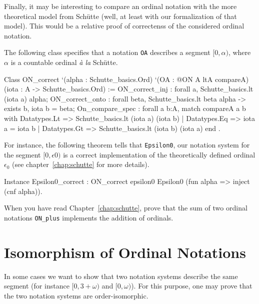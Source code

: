 Finally, it may be interesting to compare an ordinal notation with the more theoretical model from Schütte (well, at least with our formalization of that model). This would be a relative proof of correctenss of the considered  ordinal  notation.

The following class specifies that a notation \texttt{OA} describes a segment $[0,\alpha)$,
where $\alpha$ is a countable ordinal \emph{à la}  Schütte.


\label{types:ON-for}

\begin{Coqsrc}
Class ON_correct `(alpha : Schutte_basics.Ord)
     `(OA : @ON A ltA  compareA)
      (iota : A -> Schutte_basics.Ord) :=
  { ON_correct_inj : forall a, Schutte_basics.lt (iota a) alpha;
    ON_correct_onto : forall beta, Schutte_basics.lt beta alpha ->
                                exists b, iota b = beta;
    On_compare_spec : forall a b:A,
        match compareA a b with
          Datatypes.Lt => Schutte_basics.lt (iota a) (iota b)
        | Datatypes.Eq => iota a = iota b
        | Datatypes.Gt => Schutte_basics.lt (iota b) (iota a)
        end
}.
\end{Coqsrc}



For instance, the following theorem tells that \texttt{Epsilon0}, our notation system for the segment $[0,\epsilon0)$ is a correct implementation of the theoretically defined  ordinal $\epsilon_0$
(see chapter~\ref{chap:schutte} for more details).


\begin{Coqsrc}
Instance Epsilon0_correct :
  ON_correct epsilon0 Epsilon0  (fun alpha => inject (cnf alpha)).
\end{Coqsrc}


\begin{project}
  When you have read Chapter~\ref{chap:schutte}, prove that the sum of two ordinal notations \texttt{ON\_plus} implements the addition of ordinals.
\end{project}





\section{Isomorphism of Ordinal Notations}


In some cases we want to show that two notation systems describe the same segment (for instance $[0,3+\omega)$ and $[0,\omega)$\;). For this purpose, one may prove that the two notation systems are order-isomorphic.

